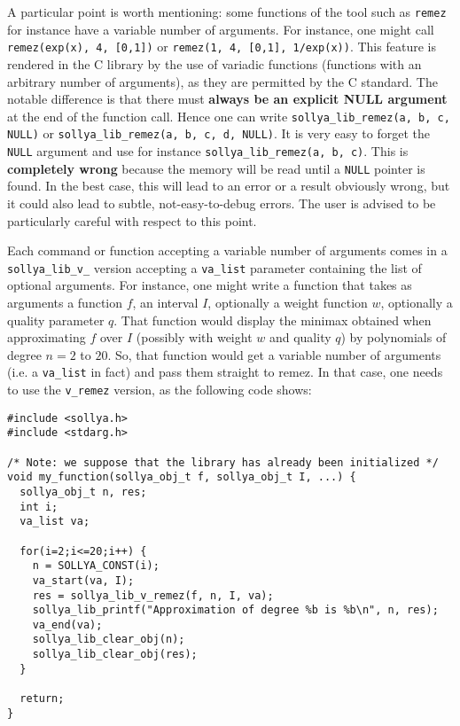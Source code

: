\documentclass[a4paper]{article}
\begin{document}
A particular point is worth mentioning: some functions of the tool such as \texttt{remez} for instance have a variable number of arguments. For instance, one might call \texttt{remez(exp(x), 4, [0,1])} or \texttt{remez(1, 4, [0,1], 1/exp(x))}. This feature is rendered in the C library by the use of variadic functions (functions with an arbitrary number of arguments), as they are permitted by the C standard. The notable difference is that there must \textbf{always be an explicit NULL argument} at the end of the function call. Hence one can write \texttt{sollya\_lib\_remez(a, b, c, NULL)} or \texttt{sollya\_lib\_remez(a, b, c, d, NULL)}. It is very easy to forget the \texttt{NULL} argument and use for instance \texttt{sollya\_lib\_remez(a, b, c)}. This is \textbf{completely wrong} because the memory will be read until a \texttt{NULL} pointer is found. In the best case, this will lead to an error or a result obviously wrong, but it could also lead to subtle, not-easy-to-debug errors. The user is advised to be particularly careful with respect to this point.

Each command or function accepting a variable number of arguments comes in a \texttt{sollya\_lib\_v\_} version accepting a \texttt{va\_list} parameter containing the list of optional arguments. For instance, one might write a function that takes as arguments a function $f$, an interval $I$, optionally a weight function $w$, optionally a quality parameter $q$. That function would display the minimax obtained when approximating $f$ over $I$ (possibly with weight $w$ and quality $q$) by polynomials of degree $n=2$ to $20$. So, that function would get a variable number of arguments (i.e. a \texttt{va\_list} in fact) and pass them straight to remez. In that case, one needs to use the \texttt{v\_remez} version, as the following code shows:

\begin{center}\begin{minipage}{15cm}\begin{Verbatim}[frame=single]
#include <sollya.h>
#include <stdarg.h>

/* Note: we suppose that the library has already been initialized */
void my_function(sollya_obj_t f, sollya_obj_t I, ...) {
  sollya_obj_t n, res;
  int i;
  va_list va;

  for(i=2;i<=20;i++) {
    n = SOLLYA_CONST(i);
    va_start(va, I);
    res = sollya_lib_v_remez(f, n, I, va);
    sollya_lib_printf("Approximation of degree %b is %b\n", n, res);
    va_end(va);
    sollya_lib_clear_obj(n);
    sollya_lib_clear_obj(res);
  }

  return;
}
\end{Verbatim}
\end{minipage}\end{center}
\end{document}
